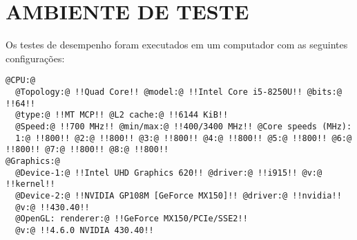 \section{\normalsize AMBIENTE DE TESTE}
	Os testes de desempenho foram executados em um computador com as seguintes configurações:
	\begin{lstlisting}[frame=single,style=base]
@CPU:@
  @Topology:@ !!Quad Core!! @model:@ !!Intel Core i5-8250U!! @bits:@ !!64!! 
  @type:@ !!MT MCP!! @L2 cache:@ !!6144 KiB!! 
  @Speed:@ !!700 MHz!! @min/max:@ !!400/3400 MHz!! @Core speeds (MHz): 
  1:@ !!800!! @2:@ !!800!! @3:@ !!800!! @4:@ !!800!! @5:@ !!800!! @6:@ !!800!! @7:@ !!800!! @8:@ !!800!! 
@Graphics:@
  @Device-1:@ !!Intel UHD Graphics 620!! @driver:@ !!i915!! @v:@ !!kernel!! 
  @Device-2:@ !!NVIDIA GP108M [GeForce MX150]!! @driver:@ !!nvidia!! 
  @v:@ !!430.40!!
  @OpenGL: renderer:@ !!GeForce MX150/PCIe/SSE2!! 
  @v:@ !!4.6.0 NVIDIA 430.40!! 
    \end{lstlisting}